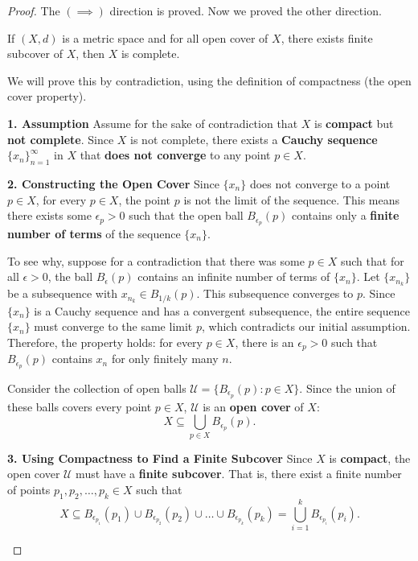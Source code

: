 \begin{proof}
    The \((\implies )\) direction is proved. Now we proved the other direction.
    \begin{claim} \label{clm: compact complete open cover ver}
        If \((X, d)\) is a metric space and for all open cover of \(X\), there exists finite subcover of \(X\), then \(X\) is complete.    
    \end{claim} 
    \begin{explanation}
        We will prove this by contradiction, using the definition of compactness (the open cover property).

        \textbf{1. Assumption}
        Assume for the sake of contradiction that $X$ is \textbf{compact} but \textbf{not complete}.
        Since $X$ is not complete, there exists a \textbf{Cauchy sequence} $\{x_n\}_{n=1}^{\infty}$ in $X$ that \textbf{does not converge} to any point $p \in X$.

        \textbf{2. Constructing the Open Cover}
        Since $\{x_n\}$ does not converge to a point $p \in X$, for every $p \in X$, the point $p$ is not the limit of the sequence. This means there exists some $\epsilon_p > 0$ such that the open ball $B_{\epsilon_p}(p)$ contains only a \textbf{finite number of terms} of the sequence $\{x_n\}$.

        To see why, suppose for a contradiction that there was some $p \in X$ such that for all $\epsilon > 0$, the ball $B_{\epsilon}(p)$ contains an infinite number of terms of $\{x_n\}$. Let $\{x_{n_k}\}$ be a subsequence with $x_{n_k} \in B_{1/k}(p)$. This subsequence converges to $p$. Since $\{x_n\}$ is a Cauchy sequence and has a convergent subsequence, the entire sequence $\{x_n\}$ must converge to the same limit $p$, which contradicts our initial assumption.
        Therefore, the property holds: for every $p \in X$, there is an $\epsilon_p > 0$ such that $B_{\epsilon_p}(p)$ contains $x_n$ for only finitely many $n$.

        Consider the collection of open balls
        $\mathcal{U} = \{B_{\epsilon_p}(p) : p \in X\}.$
        Since the union of these balls covers every point $p \in X$, $\mathcal{U}$ is an \textbf{open cover} of $X$:
        $$X \subseteq \bigcup_{p \in X} B_{\epsilon_p}(p).$$

        \textbf{3. Using Compactness to Find a Finite Subcover}
        Since $X$ is \textbf{compact}, the open cover $\mathcal{U}$ must have a \textbf{finite subcover}. That is, there exist a finite number of points $p_1, p_2, \dots, p_k \in X$ such that
        $$X \subseteq B_{\epsilon_{p_1}}(p_1) \cup B_{\epsilon_{p_2}}(p_2) \cup \dots \cup B_{\epsilon_{p_k}}(p_k) = \bigcup_{i=1}^k B_{\epsilon_{p_i}}(p_i).$$


\end{explanation}
\end{proof}

